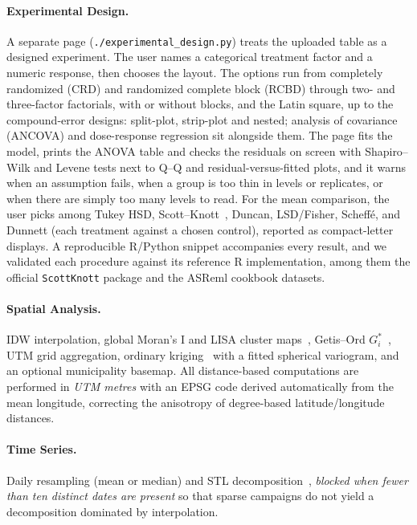 \documentclass[preprint,12pt,a4paper]{elsarticle}
\begin{document}
\paragraph{Experimental Design.} A separate page (\texttt{./experimental\_design.py}) treats the uploaded table as a designed experiment. The user names a categorical treatment factor and a numeric response, then chooses the layout. The options run from completely randomized (CRD) and randomized complete block (RCBD) through two- and three-factor factorials, with or without blocks, and the Latin square, up to the compound-error designs: split-plot, strip-plot and nested; analysis of covariance (ANCOVA) and dose-response regression sit alongside them. The page fits the model, prints the ANOVA table and checks the residuals on screen with Shapiro--Wilk and Levene tests next to Q--Q and residual-versus-fitted plots, and it warns when an assumption fails, when a group is too thin in levels or replicates, or when there are simply too many levels to read. For the mean comparison, the user picks among Tukey HSD, Scott--Knott~\cite{ScottKnott1974}, Duncan, LSD/Fisher, Scheff\'e, and Dunnett (each treatment against a chosen control), reported as compact-letter displays. A reproducible R/Python snippet accompanies every result, and we validated each procedure against its reference R implementation, among them the official \texttt{ScottKnott} package and the ASReml cookbook datasets.

\paragraph{Spatial Analysis.} IDW interpolation, global Moran's I and LISA cluster maps~\cite{Anselin1995}, Getis--Ord $G_i^*$~\cite{Getis1992}, UTM grid aggregation, ordinary kriging~\cite{Cressie1993} with a fitted spherical variogram, and an optional municipality basemap. All distance-based computations are performed in \emph{UTM metres} with an EPSG code derived automatically from the mean longitude, correcting the anisotropy of degree-based latitude/longitude distances.

\paragraph{Time Series.} Daily resampling (mean or median) and STL decomposition~\cite{Cleveland1990STL}, \emph{blocked when fewer than ten distinct dates are present} so that sparse campaigns do not yield a decomposition dominated by interpolation.
\end{document}
